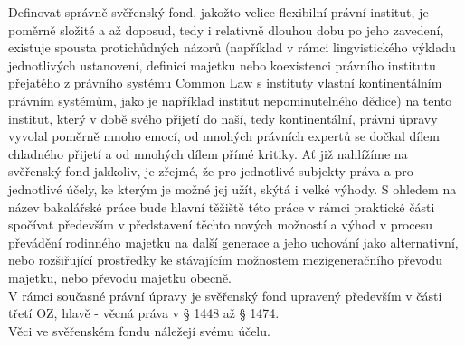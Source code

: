 \documentclass{article}
\begin{document}
Definovat správně svěřenský fond, jakožto velice flexibilní právní institut, je poměrně složité a až doposud, tedy i relativně dlouhou dobu po jeho zavedení, existuje spousta protichůdných názorů (například v rámci lingvistického výkladu jednotlivých ustanovení, definicí majetku nebo koexistenci právního institutu přejatého z právního systému Common Law s instituty vlastní kontinentálním právním systémům, jako je například institut nepominutelného dědice) na tento institut, který v době svého přijetí do naší, tedy kontinentální, právní úpravy vyvolal poměrně mnoho emocí, od mnohých právních expertů se dočkal dílem chladného přijetí a od mnohých dílem přímé kritiky. Ať již nahlížíme na svěřenský fond jakkoliv, je zřejmé, že pro jednotlivé subjekty práva a pro jednotlivé účely, ke kterým je možné jej užít, skýtá i velké výhody. S ohledem na název bakalářské práce bude hlavní těžiště této práce v rámci praktické části spočívat především v představení těchto nových možností a výhod v procesu převádění rodinného majetku na další generace a jeho uchování jako alternativní, nebo rozšiřující prostředky ke stávajícím možnostem mezigeneračního převodu majetku, nebo převodu majetku obecně. \\



V rámci současné právní úpravy je svěřenský fond upravený především v části třetí OZ, hlavě \MakeUppercase{{}} - věcná práva v § 1448 až § 1474. \\


Věci ve svěřenském fondu náležejí svému účelu.\\
\end{document}

